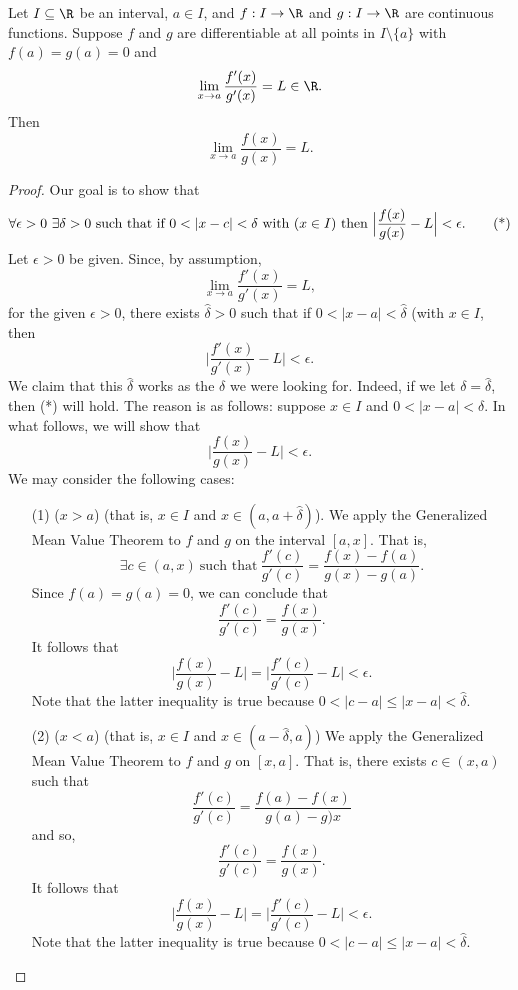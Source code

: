 \begin{theorem}
    Let \( I \subseteq  \R   \) be an interval, \( a \in I  \), and \( f: I \to \R  \) and \( g: I \to \R  \) are continuous functions. Suppose \( f  \) and \( g  \) are differentiable at all points in \( I \setminus  \{  a  \}  \) with \( f(a) = g(a) = 0  \) and 
    \[  \lim_{ x \to a }  \frac{ f'(x) }{ g'(x) }  = L \in \R.  \]
    Then 
    \[  \lim_{ x \to a }  \frac{ f(x) }{ g(x) }  = L. \]
\end{theorem}
\begin{proof}
Our goal is to show that 
\[  \forall \epsilon > 0 \ \exists \delta > 0 \ \text{such that if} \ 0 < | x - c  | < \delta \ \text{with (\( x \in I \)) then} \ \Big| \frac{ f(x) }{  g(x) }  - L  \Big|  < \epsilon. \tag{*} \]
Let \( \epsilon > 0  \) be given. Since, by assumption,  
\[  \lim_{ x \to a }  \frac{ f'(x) }{  g'(x) }  = L,  \]
for the given \( \epsilon > 0  \), there exists \( \hat{\delta} > 0 \) such that if \( 0 < |  x - a  |  < \hat{\delta} \) (with \( x \in I  \), then
\[  \Big| \frac{ f'(x) }{ g'(x) }  - L  \Big| < \epsilon. \]
We claim that this \( \hat{\delta} \) works as the \( \delta  \) we were looking for. Indeed, if we let \( \delta = \hat{\delta} \), then (*) will hold. The reason is as follows: suppose \( x \in I  \) and \(  0 < |  x - a  |  < \delta \). In what follows, we will show that  
\[  \Big| \frac{ f(x) }{ g(x) }  - L  \Big|  < \epsilon. \]
We may consider the following cases:
\begin{enumerate}
    \item[(1)] (\( x > a  \)) (that is, \( x \in I  \) and \( x \in (a, a + \hat{\delta}) \)). We apply the Generalized Mean Value Theorem to \( f  \) and \( g  \) on the interval \( [a,x] \). That is,  
        \[  \exists c \in (a,x) \ \text{such that} \ \frac{ f'(c) }{ g'(c) }  = \frac{ f(x) - f(a) }{  g(x) - g(a) }. \]
        Since \( f(a) = g(a) = 0  \), we can conclude that 
        \[  \frac{ f'(c) }{  g'(c) }  = \frac{ f(x) }{ g(x) }. \]
        It follows that 
        \[  \Big| \frac{ f(x) }{  g(x) }  - L  \Big|  = \Big| \frac{ f'(c) }{ g'(c) }  - L  \Big| < \epsilon. \]
        Note that the latter inequality is true because \( 0 < |  c - a  |  \leq |  x - a  |  < \hat{\delta} \).
    \item[(2)] (\( x < a  \)) (that is, \( x \in I  \) and \( x \in (a - \hat{\delta} , a ) \)) We apply the Generalized Mean Value Theorem to \( f  \) and \( g  \) on \( [x,a] \). That is, there exists \( c \in (x,a) \) such that  
        \[  \frac{ f'(c) }{  g'(c) }  = \frac{ f(a) - f(x) }{  g(a) - g)x }  \]
        and so,
        \[  \frac{ f'(c) }{ g'(c) }  = \frac{ f(x) }{ g(x) }. \]
        It follows that 
        \[  \Big| \frac{ f(x) }{ g(x) }  - L  \Big|  = \Big| \frac{ f'(c) }{ g'(c) }  - L  \Big|  < \epsilon. \]
        Note that the latter inequality is true because \( 0 < |  c- a  |  \leq |  x - a  |  < \hat{\delta}. \)

\end{enumerate}
\end{proof}

